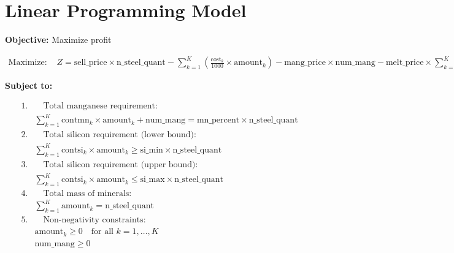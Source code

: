 \documentclass{article}
\begin{document}
\section*{Linear Programming Model}

\textbf{Objective:} Maximize profit

\begin{align*}
\text{Maximize: } & Z = \text{sell\_price} \times \text{n\_steel\_quant} - \sum_{k=1}^{K} \left( \frac{\text{cost}_k}{1000} \times \text{amount}_k \right) - \text{mang\_price} \times \text{num\_mang} - \text{melt\_price} \times \sum_{k=1}^{K} \text{amount}_k
\end{align*}

\textbf{Subject to:}

\begin{align*}
1. & \quad \text{Total manganese requirement:} \\
& \sum_{k=1}^{K} \text{contmn}_k \times \text{amount}_k + \text{num\_mang} = \text{mn\_percent} \times \text{n\_steel\_quant} \\
2. & \quad \text{Total silicon requirement (lower bound):} \\
& \sum_{k=1}^{K} \text{contsi}_k \times \text{amount}_k \geq \text{si\_min} \times \text{n\_steel\_quant} \\
3. & \quad \text{Total silicon requirement (upper bound):} \\
& \sum_{k=1}^{K} \text{contsi}_k \times \text{amount}_k \leq \text{si\_max} \times \text{n\_steel\_quant} \\
4. & \quad \text{Total mass of minerals:} \\
& \sum_{k=1}^{K} \text{amount}_k = \text{n\_steel\_quant} \\
5. & \quad \text{Non-negativity constraints:} \\
& \text{amount}_k \geq 0 \quad \text{for all } k = 1, \ldots, K \\
& \text{num\_mang} \geq 0
\end{align*}
\end{document}
